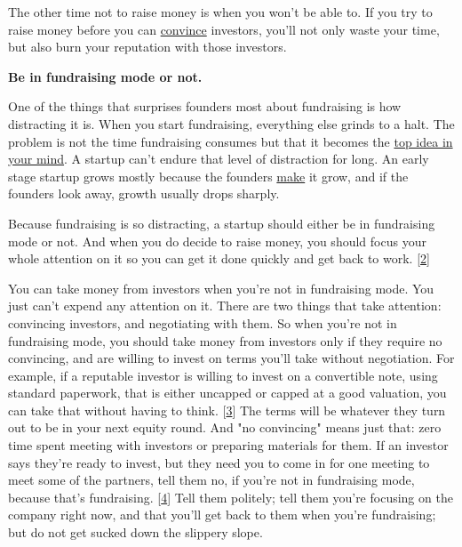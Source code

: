The other time not to raise money is
                    when you won't be able to. If you try to raise money before
                    you can \href{http://www.paulgraham.com/convince.html}{convince} investors,
                    you'll not only waste your time, but also burn your
                    reputation with those investors.


                    \textbf{Be in fundraising mode or not.}

One of the
                    things that surprises founders most about fundraising is how
                    distracting it is. When you start fundraising, everything
                    else grinds to a halt. The problem is not the time
                    fundraising consumes but that it becomes the
                    \href{http://www.paulgraham.com/top.html}{top idea in your mind}. A startup
                    can't endure that level of distraction for long. An early
                    stage startup grows mostly because the founders
                    \href{http://www.paulgraham.com/ds.html}{make} it grow, and if the founders look
                    away, growth usually drops sharply.

Because
                    fundraising is so distracting, a startup should either be in
                    fundraising mode or not. And when you do decide to raise
                    money, you should focus your whole attention on it so you
                    can get it done quickly and get back to work.
                    [\href{\#f2n}{2}]

You can take money from investors when you're
                    not in fundraising mode. You just can't expend any attention
                    on it. There are two things that take attention: convincing
                    investors, and negotiating with them. So when you're not in
                    fundraising mode, you should take money from investors only
                    if they require no convincing, and are willing to invest on
                    terms you'll take without negotiation. For example, if a
                    reputable investor is willing to invest on a convertible
                    note, using standard paperwork, that is either uncapped or
                    capped at a good valuation, you can take that without having
                    to think.
                    [\href{\#f3n}{3}]
                    The terms will be whatever they turn out to be in your next
                    equity round. And "no convincing" means just that: zero time
                    spent meeting with investors or preparing materials for
                    them. If an investor says they're ready to invest, but they
                    need you to come in for one meeting to meet some of the
                    partners, tell them no, if you're not in fundraising mode,
                    because that's fundraising.
                    [\href{\#f4n}{4}]
                    Tell them politely; tell them you're focusing on the company
                    right now, and that you'll get back to them when you're
                    fundraising; but do not get sucked down the slippery
                    slope.

